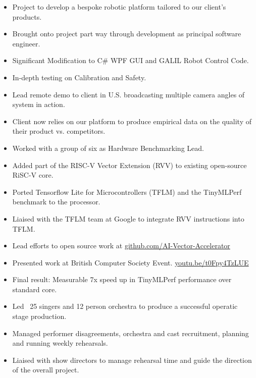 {
  {\begin{itemize}
    \item Project to develop a bespoke robotic platform tailored to our client's products. 
    \item Brought onto project part way through development as principal software engineer.
    \item Significant Modification to C\# WPF GUI and GALIL Robot Control Code. 
    \item In-depth testing on Calibration and Safety. 
    \item Lead remote demo to client in U.S. broadcasting multiple camera angles of system in action. 
    \item Client now relies on our platform to produce empirical data on the quality of their product vs. competitors.
  \end{itemize} 
  }
}

{
  {\begin{itemize}
    \item Worked with a group of six as Hardware Benchmarking Lead.
    \item Added part of the RISC-V Vector Extension (RVV) to existing open-source RiSC-V core.
    \item Ported Tensorflow Lite for Microcontrollers (TFLM) and the TinyMLPerf benchmark to the processor.
    \item Liaised with the TFLM team at Google to integrate RVV instructions into TFLM. 
    \item Lead efforts to open source work at \url{github.com/AI-Vector-Accelerator}
    \item Presented work at British Computer Society Event. \url{youtu.be/t0Fpy4TzLUE}
    \item Final result: Measurable 7x speed up in TinyMLPerf performance over standard core.
  \end{itemize} 
  }
}

{
  {\begin{itemize}
    \item Led ~25 singers and 12 person orchestra to produce a successful operatic stage production.
    \item Managed performer disagreements, orchestra and cast recruitment, planning and running weekly rehearsals.  
    \item Liaised with show directors to manage rehearsal time and guide the direction of the overall project.
  \end{itemize}
  }
}


